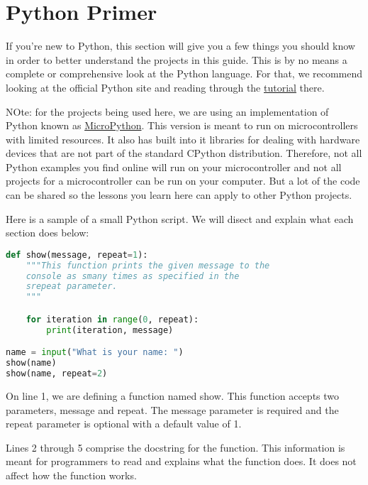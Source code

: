 \chapter{Python Primer}
If you're new to Python, this section will give you a few things you should know
in order to better understand the projects in this guide. This is by no means a
complete or comprehensive look at the Python language. For that, we recommend looking
at the official Python site and reading through the \href{https://docs.python.org/3/tutorial/}{tutorial}
there.
\linebreak

\begin{tcolorbox}
    NOte: for the projects being used here, we are using an implementation of
    Python known as \href{https://micropython.org/}{MicroPython}. This version
    is meant to run on microcontrollers with limited resources. It
    also has built into it libraries for dealing with hardware devices that are
    not part of the standard CPython distribution. Therefore, not all Python examples
    you find online will run on your microcontroller and not all projects for a
    microcontroller can be run on your computer. But a lot of the code can be shared
    so the lessons you learn here can apply to other Python projects.
\end{tcolorbox}

Here is a sample of a small Python script. We will disect and explain what each
section does below:

\begin{lstlisting}[language=Python,caption=An example Python script]
def show(message, repeat=1):
    """This function prints the given message to the
    console as smany times as specified in the
    srepeat parameter.
    """

    for iteration in range(0, repeat):
        print(iteration, message)

name = input("What is your name: ")
show(name)
show(name, repeat=2)
\end{lstlisting}

On line 1, we are defining a function named show. This function accepts two parameters,
message and repeat. The message parameter is required and the repeat parameter
is optional with a default value of 1.

Lines 2 through 5 comprise the docstring for the function. This information is meant
for programmers to read and explains what the function does. It does not affect how
the function works.

